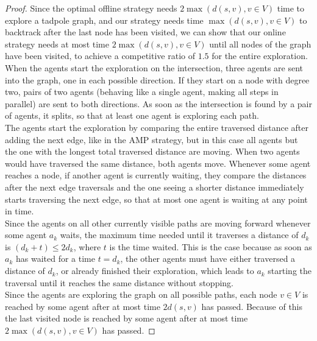 \begin{proof}
    Since the optimal offline strategy needs $2\max(d(s,v), v\in V)$ time to explore a tadpole graph, and our strategy needs time $\max(d(s,v), v\in V)$ to backtrack after
    the last node has been visited, we can show that our online strategy needs at most time $2\max(d(s,v), v\in V)$ until all nodes of the graph have been visited, to achieve a competitive
    ratio of $1.5$ for the entire exploration.\\
    When the agents start the exploration on the intersection, three agents are sent into the graph, one in each possible direction. If they start on a node with degree two, pairs of 
    two agents (behaving like a single agent, making all steps in parallel) are sent to both directions. As soon as the intersection is found by a pair of agents, it splits, so that at 
    least one agent is exploring each path.\\
    The agents start the exploration by comparing the entire traversed distance after adding the next edge, like in the AMP strategy, but in this case all agents but the
    one with the longest total traversed distance are moving. When two agents would have traversed the same distance, both agents move. Whenever some agent reaches a node, if another agent is currently waiting, they compare the distances after the next edge
    traversals and the one seeing a shorter distance immediately starts traversing the next edge, so that at most one agent is waiting at any point in time.\\
    Since the agents on all other currently visible paths are moving forward whenever some agent $a_k$ waits, the maximum time needed until it traverses a distance of $d_k$ is $(d_k + t) \leq 2d_k$,
    where $t$ is the time waited. This is the case because as soon as $a_k$ has waited for a time $t=d_k$, the other agents must have either traversed a distance of $d_k$, 
    or already finished their exploration, which leads to $a_k$ starting the traversal until it reaches the same distance without stopping.\\
    Since the agents are exploring the graph on all possible paths, each node $v\in V$ is reached by some agent after at most time $2d(s, v)$ has passed. Because of this the last visited node 
    is reached by some agent after at most time $2\max(d(s,v), v\in V)$ has passed.
\end{proof}
